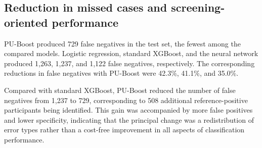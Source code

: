 \documentclass[10pt]{article}
\begin{document}
\begin{table}[!t]
\caption{\textbf{Test-set predictive performance of PU-Boost and baseline models.} All models were evaluated against the reference disease status Y in the same independent test set (n=8,611) using a classification threshold of 0.5. TP, true positives; TN, true negatives; FP, false positives; FN, false negatives; NPV, negative predictive value. Boldface indicates the highest observed value for each performance metric. Model comparisons are descriptive.}
\label{tab:performance}
\centering
\setlength{\tabcolsep}{3.8pt}
\renewcommand{\arraystretch}{1.08}
\end{table}

\subsection{Reduction in missed cases and screening-oriented performance}

PU-Boost produced 729 false negatives in the test set, the fewest among
the compared models. Logistic regression, standard XGBoost, and the
neural network produced 1,263, 1,237, and 1,122 false negatives,
respectively. The corresponding reductions in false negatives with
PU-Boost were 42.3\%, 41.1\%, and 35.0\%.

Compared with standard XGBoost, PU-Boost reduced the number of false
negatives from 1,237 to 729, corresponding to 508 additional
reference-positive participants being identified. This gain was
accompanied by more false positives and lower specificity, indicating
that the principal change was a redistribution of error types rather
than a cost-free improvement in all aspects of classification
performance.
\end{document}
